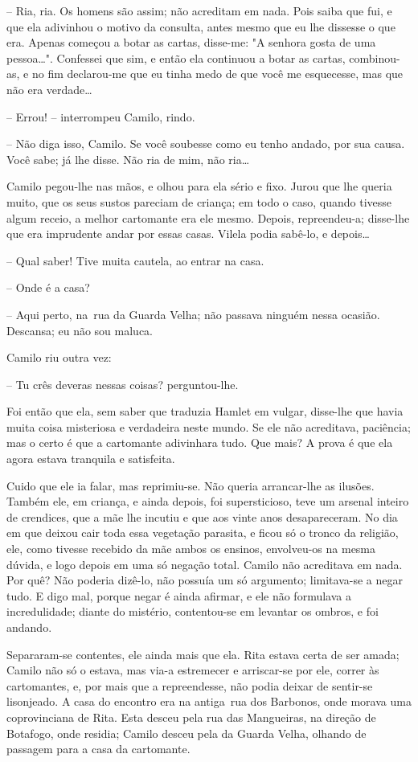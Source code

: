 -- Ria, ria. Os homens são assim; não acreditam em nada. Pois saiba que
fui, e que ela adivinhou o motivo da consulta, antes mesmo que eu lhe
dissesse o que era. Apenas começou a botar as cartas, disse-me: "A
senhora gosta de uma pessoa\ldots{}". Confessei que sim, e então ela
continuou a botar as cartas, combinou-as, e no fim declarou-me que eu
tinha medo de que você me esquecesse, mas que não era verdade\ldots{}

-- Errou! -- interrompeu Camilo, rindo.

-- Não diga isso, Camilo. Se você soubesse como eu tenho andado, por sua
causa. Você sabe; já lhe disse. Não ria de mim, não ria\ldots{}

Camilo pegou-lhe nas mãos, e olhou para ela sério e fixo. Jurou que lhe
queria muito, que os seus sustos pareciam de criança; em todo o caso,
quando tivesse algum receio, a melhor cartomante era ele mesmo. Depois,
repreendeu-a; disse-lhe que era imprudente andar por essas casas. Vilela
podia sabê-lo, e depois\ldots{}

-- Qual saber! Tive muita cautela, ao entrar na casa.

-- Onde é a casa?

-- Aqui perto, na~rua da Guarda Velha; não passava ninguém nessa
ocasião. Descansa; eu não sou maluca.

Camilo riu outra vez:

-- Tu crês deveras nessas coisas? perguntou-lhe.

Foi então que ela, sem saber que traduzia Hamlet em vulgar, disse-lhe
que havia muita coisa misteriosa e verdadeira neste mundo. Se ele não
acreditava, paciência; mas o certo é que a cartomante adivinhara tudo.
Que mais? A prova é que ela agora estava tranquila e satisfeita.

Cuido que ele ia falar, mas reprimiu-se. Não queria arrancar-lhe as
ilusões. Também ele, em criança, e ainda depois, foi supersticioso, teve
um arsenal inteiro de crendices, que a mãe lhe incutiu e que aos vinte
anos desapareceram. No dia em que deixou cair toda essa vegetação
parasita, e ficou só o tronco da religião, ele, como tivesse recebido da
mãe ambos os ensinos, envolveu-os na mesma dúvida, e logo depois em uma
só negação total. Camilo não acreditava em nada. Por quê? Não poderia
dizê-lo, não possuía um só argumento; limitava-se a negar tudo. E digo
mal, porque negar é ainda afirmar, e ele não formulava a incredulidade;
diante do mistério, contentou-se em levantar os ombros, e foi andando.

Separaram-se contentes, ele ainda mais que ela. Rita estava certa de ser
amada; Camilo não só o estava, mas via-a estremecer e arriscar-se por
ele, correr às cartomantes, e, por mais que a repreendesse, não podia
deixar de sentir-se lisonjeado. A casa do encontro era na antiga~rua dos
Barbonos, onde morava uma coprovinciana de Rita. Esta desceu pela rua
das Mangueiras, na direção de Botafogo, onde residia; Camilo desceu pela
da Guarda Velha, olhando de passagem para a casa da cartomante.

